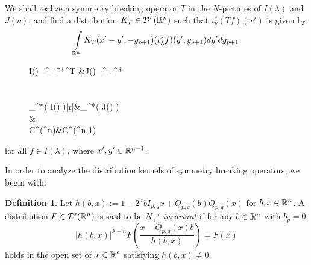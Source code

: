 \documentclass[reqno,12pt]{pja00} %
\newcommand{\tmtextit}[1]{{\itshape{#1}}}
\newcommand{\Hom}{\mbox{\normalfont Hom}}
\newtheorem{fact}[theorem]{Fact}
\theoremstyle{definition}
\newtheorem{definition}[theorem]{Definition}
\theoremstyle{exampstyle} \newtheorem{examp}[theorem]{Theorem}
\renewcommand{\Q}{Q_{p,q}}
\newcommand{\IlambdaGprime}{I(\lambda)\kern-0.3em\mid_{G'}}
\newcommand{\SBO}{\Hom_{G'}\left(\IlambdaGprime,J(\nu) \right)}
\begin{document}
We shall realize
a symmetry breaking operator $T$ in the $N$-pictures of $I(\lambda)$ and $J(\nu)$, and
find a distribution $K_T\in\mathcal{D}'\left( \mathbb{R}^n \right)$ such that $\iota^*_\nu(Tf)(x')$ is given by
\begin{equation*}
	\int_{\R^n}K_T(x'-y',-y_{p+1})(\iota_\lambda^*f)(y',y_{p+1})dy'dy_{p+1}
\end{equation*}
\begin{figure}[h]
\centering
\hspace{1.2cm}
	\xymatrix@R=1mm
	{
		I(\lambda)\ar[ddd]_{}^{\iota_\lambda^{*}}\ar[r]^T &J(\nu)\ar[ddd]_{}^{\iota_\nu^{*}}\\
		\\\\
		\iota_\lambda^*\left( I(\lambda) \right)\ar@{-->}[r]&\iota_\nu^{*}\left( J(\nu) \right)\vspace*{-1cm}\\
		\vspace*{-1cm}\bigcap&\bigcap\\
		C^\infty(\R^n)&C^\infty(\R^{n-1})
	}
\end{figure}
for all $f\in I(\lambda)$, where $x',y'\in\mathbb{R}^{n-1}$. 


In order to analyze the 
distribution kernels
of symmetry breaking operators, we begin with:
\begin{definition} \label{def1}
	Let $h(b,x):=1-2\,^t\!bI_{p,q}x+\Q(b)\Q(x)$ for $b,x\in\mathbb{R}^{n}$. A distribution
	$F \in \mathcal{D}' (\mathbb{R}^n)$ is said to be
  \tmtextit{$N_+'$-invariant} if 
  for any $b\in\mathbb{R}^n$ with $b_p=0$
  \begin{equation*}
    \label{eq-Nequiv} | h(b,x) |^{\lambda - n} F \left(
    \frac{x - \Q (x) b}{h(b,x)} \right) = F (x)
  \end{equation*}
  holds in the open set of $x\in\mathbb{R}^{n}$ satisfying $h(b,x)\neq0$.
  
\end{definition}
\end{document}
